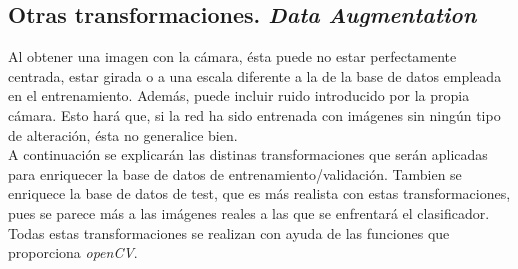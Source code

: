 \subsection{Otras transformaciones. \textit{Data Augmentation}}
Al obtener una imagen con la cámara, ésta puede no estar perfectamente centrada, estar girada o a una escala diferente a la de la base de datos empleada en el entrenamiento. Además, puede incluir ruido introducido por la propia cámara. Esto hará que, si la red ha sido entrenada con imágenes sin ningún tipo de alteración, ésta no generalice bien.\\

A continuación se explicarán las distinas transformaciones que serán aplicadas para enriquecer la base de datos de entrenamiento/validación. Tambien se enriquece la base de datos de test, que es más realista con estas transformaciones, pues se parece más a las imágenes reales a las que se enfrentará el clasificador. Todas estas transformaciones se realizan con ayuda de las funciones que proporciona \textit{openCV}.
\vspace{10pt}
